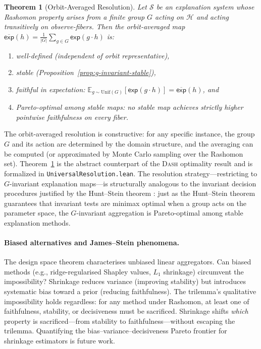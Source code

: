 \documentclass[11pt,a4paper]{article}
\newtheorem{theorem}{Theorem}[section]
\newcommand{\E}{\mathbb{E}}
\newcommand{\DASH}{\textsc{Dash}}
\newcommand{\sH}{\mathcal{H}}
\begin{document}
\begin{theorem}[Orbit-Averaged Resolution]
\label{thm:orbit-average}
Let $\mathcal{S}$ be an explanation system whose Rashomon property arises
from a finite group $G$ acting on $\sH$ and acting transitively on
observe-fibers.  Then the orbit-averaged map
$\overline{\mathsf{exp}}(h) = \frac{1}{|G|}\sum_{g \in G}\mathsf{exp}(g \cdot h)$
is:
\begin{enumerate}[label=(\roman*)]
  \item well-defined (independent of orbit representative),
  \item stable (Proposition~\ref{prop:g-invariant-stable}),
  \item faithful in expectation: $\E_{g \sim \mathrm{Unif}(G)}[\mathsf{exp}(g \cdot h)] = \overline{\mathsf{exp}}(h)$, and
  \item Pareto-optimal among stable maps: no stable map achieves strictly
    higher pointwise faithfulness on every fiber.
\end{enumerate}
\end{theorem}

\noindent
The orbit-averaged resolution is constructive: for any specific instance, the
group $G$ and its action are determined by the domain structure, and the
averaging can be computed (or approximated by Monte Carlo sampling over the
Rashomon set).  Theorem~\ref{thm:orbit-average} is the abstract counterpart
of the \DASH{} optimality result and is formalized in
\texttt{UniversalResolution.lean}.
The resolution strategy---restricting to $G$-invariant explanation maps---is
structurally analogous to the invariant decision procedures justified by the
Hunt--Stein theorem \citep{lehmann2005testing}: just as the Hunt--Stein theorem
guarantees that invariant tests are minimax optimal when a group acts on the
parameter space, the $G$-invariant aggregation is Pareto-optimal among stable
explanation methods.

\paragraph{Biased alternatives and James--Stein phenomena.}
The design space theorem characterises unbiased linear aggregators. Can biased methods (e.g., ridge-regularised Shapley values, $L_1$ shrinkage) circumvent the impossibility? Shrinkage reduces variance (improving stability) but introduces systematic bias toward a prior (reducing faithfulness). The trilemma's qualitative impossibility holds regardless: for any method under Rashomon, at least one of faithfulness, stability, or decisiveness must be sacrificed. Shrinkage shifts \emph{which} property is sacrificed---from stability to faithfulness---without escaping the trilemma. Quantifying the bias--variance--decisiveness Pareto frontier for shrinkage estimators is future work.
\end{document}
